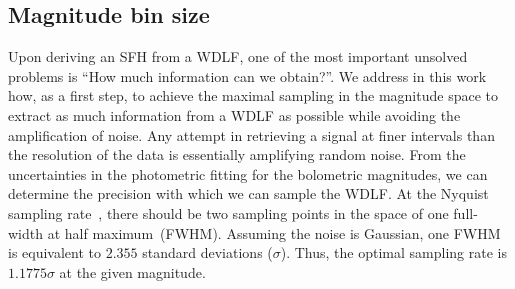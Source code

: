 \documentclass[fleqn,usenatbib]{mnras}
\begin{document}
\subsection{Magnitude bin size}
\label{sec:magnitude_bin_size}
Upon deriving an SFH from a WDLF, one of the most important unsolved problems
is ``How much information can we obtain?''. We address in this work how, as a
first step, to achieve the maximal sampling in the magnitude space to extract
as much information from a WDLF as possible while avoiding the amplification of
noise. Any attempt in retrieving a signal at finer intervals than the
resolution of the data is essentially amplifying random noise. From the
uncertainties in the photometric fitting for the bolometric magnitudes, we can
determine the precision with which we can sample the WDLF. At the Nyquist
sampling rate~\citep{1949IEEEP..37...10S}, there should be two sampling points
in the space of one full-width at half maximum~(FWHM). Assuming the noise is
Gaussian, one FWHM is equivalent to $2.355$ standard deviations ($\sigma$).
Thus, the optimal sampling rate is $1.1775\sigma$ at the given magnitude.
\end{document}
